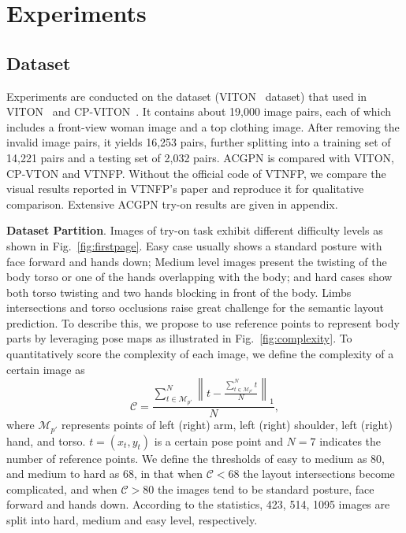 \documentclass[10pt,twocolumn,letterpaper]{article}
\begin{document}
\section{Experiments}




\subsection{Dataset}
Experiments are conducted on the dataset (\ie VITON~\cite{DBLP:conf/cvpr/HanWWYD18} dataset) that used in VITON~\cite{DBLP:conf/cvpr/HanWWYD18} and CP-VITON~\cite{DBLP:conf/eccv/WangZLCLY18}. It contains about 19,000 image pairs, each of which includes a front-view woman image and a top clothing  image. After removing the invalid image pairs, it yields 16,253 pairs, further splitting into a training set of 14,221 pairs and a testing set of 2,032 pairs. ACGPN is compared with VITON, CP-VTON and VTNFP. Without the official code of VTNFP, we compare the visual results reported in VTNFP's paper and reproduce it for qualitative comparison. Extensive ACGPN try-on results are given in appendix.




\textbf{Dataset Partition}.
Images of try-on task exhibit different difficulty levels as shown in Fig.~\ref{fig:firstpage}. Easy case usually shows a standard posture with face forward and hands down; Medium level images present the twisting of the body torso or one of the hands overlapping with the body; and hard cases show both torso twisting and two hands blocking in front of the body. Limbs intersections and torso occlusions raise great challenge for the semantic layout prediction. To describe this, we propose to use reference points to represent body parts by leveraging pose maps as illustrated in Fig.~\ref{fig:complexity}. To quantitatively score the complexity of each image, we define the complexity of a certain image as
\vspace{-5pt}
\begin{equation}
\mathcal{C}=\frac{\sum_{t\in \mathcal{M}_{p'}}^N \left\lVert t-\frac{\sum_{t\in \mathcal{M}_{p'}}^Nt}{N}\right\rVert_1}{N},
\end{equation}
where $\mathcal{M}_{p'}$ represents points of left (right) arm, left (right) shoulder, left (right) hand, and torso. $t=\left(x_t,y_t\right)$ is a certain pose point and $N=7$ indicates the number of reference points. We define the thresholds of easy to medium as 80, and medium to hard as 68, in that when $\mathcal{C}<68$ the layout intersections become complicated, and when $\mathcal{C}>80$ the images tend to be standard posture, face forward and hands down. According to the statistics, 423, 514, 1095 images are split into hard, medium and easy level, respectively.
\vspace{-5pt}
\end{document}

